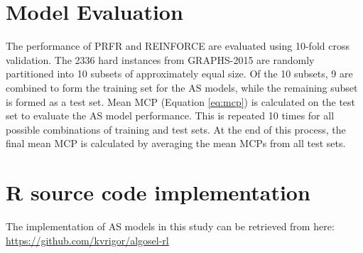 \section{Model Evaluation}
The performance of PRFR and REINFORCE are evaluated using 10-fold cross validation. The 2336 hard instances from GRAPHS-2015 are randomly partitioned into 10 subsets of approximately equal size. Of the 10 subsets, 9 are combined to form the training set for the AS models, while the remaining subset is formed as a test set. Mean MCP (Equation \ref{eq:mcp}) is calculated on the test set to evaluate the AS model performance. This is repeated 10 times for all possible combinations of training and test sets. At the end of this process, the final mean MCP is calculated by averaging the mean MCPs from all test sets.

\section{R source code implementation}
The implementation of AS models in this study can be retrieved from here: \url{https://github.com/kvrigor/algosel-rl}